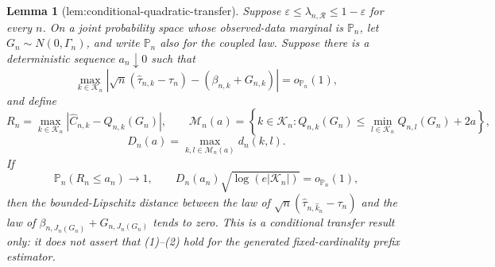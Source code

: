 \documentclass{article}
\newtheorem{lemma}{Lemma}
\begin{document}
\begin{lemma}[lem:conditional-quadratic-transfer]\label{lem:conditional-quadratic-transfer}
Suppose \(\varepsilon\leq\lambda_{n,\mathcal R}\leq1-\varepsilon\) for every \(n\).  On a joint probability space whose observed-data marginal is \(\mathbb P_n\), let \(G_n\sim N(0,\Gamma_n)\), and write \(\mathbb P_n\) also for the coupled law.  Suppose there is a deterministic sequence \(a_n\downarrow0\) such that
\[
 \max_{k\in\mathcal K_n}
 \left|
 \sqrt n(\widehat\tau_{n,k}-\tau_n)
 -(\beta_{n,k}+G_{n,k})
 \right|=o_{\mathbb P_n}(1), \tag{1}
\]
and define
\[
 R_n=\max_{k\in\mathcal K_n}
       |\widehat C_{n,k}-Q_{n,k}(G_n)|,
 \qquad
 \mathcal M_n(a)=
 \left\{k\in\mathcal K_n:
 Q_{n,k}(G_n)\leq
 \min_{l\in\mathcal K_n}Q_{n,l}(G_n)+2a
 \right\},
\]
\[
 D_n(a)=\max_{k,l\in\mathcal M_n(a)}d_n(k,l).
\]
If
\[
 \mathbb P_n(R_n\leq a_n)\longrightarrow1,
 \qquad
 D_n(a_n)\sqrt{\log(e|\mathcal K_n|)}
 =o_{\mathbb P_n}(1), \tag{2}
\]
then the bounded-Lipschitz distance between the law of
\(\sqrt n(\widehat\tau_{n,\widehat k_n}-\tau_n)\) and the law of
\(\beta_{n,J_n(G_n)}+G_{n,J_n(G_n)}\) tends to zero.  This is a conditional transfer result only: it does not assert that (1)--(2) hold for the generated fixed-cardinality prefix estimator.
\end{lemma}
\end{document}
